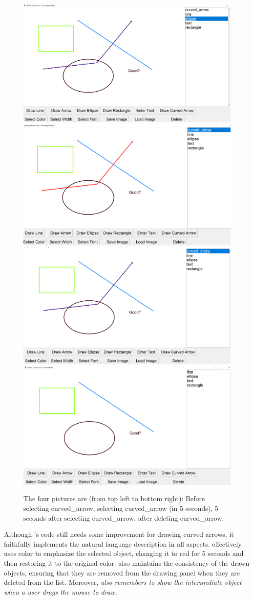 \begin{figure}[H]
\begin{AIbox}{\DV}
\begin{verbatim}
\end{verbatim}
\includegraphics[width=0.45\linewidth]{figures/g4.png} \hfill \includegraphics[width=0.45\linewidth]{figures/g20.png}
\includegraphics[width=0.45\linewidth]{figures/g3.png} \hfill \includegraphics[width=0.45\linewidth]{figures/g5.png}
\end{AIbox}
\caption{The four pictures are (from top left to bottom right): Before selecting curved\_arrow, selecting curved\_arrow (in 5 seconds), 5 seconds after selecting curved\_arrow, after deleting curved\_arrow.}
\end{figure}


Although  \DV's code still needs some improvement for drawing curved arrows, it faithfully implements the natural language description in all aspects. \DV effectively uses color to emphasize the selected object, changing it to red for 5 seconds and then restoring it to the original color. \DV also maintains the consistency of the drawn objects, ensuring that they are removed from the drawing panel when they are deleted from the list. Moreover, \emph{\DV also remembers to show the intermediate object when a user drags the mouse to draw.}


